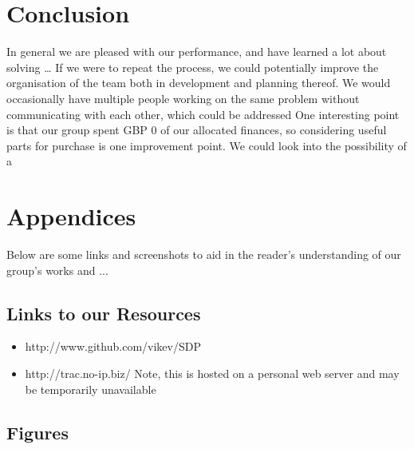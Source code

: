 \documentclass[a4paper,11pt]{article}
\begin{document}

\section{Conclusion}

In general we are pleased with our performance, and have learned a lot about solving …
    If we were to repeat the process, we could potentially improve the organisation of the team both in development and planning thereof. We would occasionally have multiple people working on the same problem without communicating with each other, which could be addressed 
    One interesting point is that our group spent GBP 0 of our allocated finances, so considering useful parts for purchase is one improvement point. We could look into the possibility of a 
    
    
    

\section{Appendices}

Below are some links and screenshots to aid in the reader’s understanding of our group’s works and ...

\subsection{Links to our Resources}

\begin{itemize}
	\item http://www.github.com/vikev/SDP
	\item http://trac.no-ip.biz/ Note, this is hosted on a personal web server and may be temporarily unavailable
\end{itemize}

\subsection{Figures}
\end{document}
